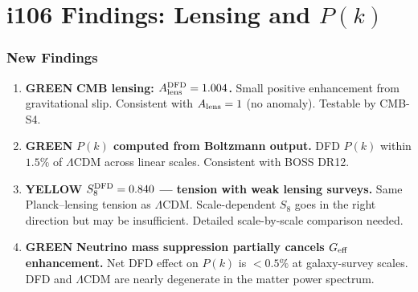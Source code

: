 \documentclass[11pt,a4paper]{article}
\theoremstyle{remark}
\newcommand{\GREEN}{\textcolor{dfdgreen}{\textbf{GREEN}}}
\newcommand{\YELLOW}{\textcolor{dfdred!70!black}{\textbf{YELLOW}}}
\begin{document}
\newpage
\part{i106 Findings: Lensing and $P(k)$}
\label{part:findings-lensing}

\section{New Findings}

\begin{enumerate}
\item[\textbf{F444}] \GREEN{} \textbf{CMB lensing: $A_{\rm lens}^{\rm DFD} = 1.004$.}
  Small positive enhancement from gravitational slip. Consistent with
  $A_{\rm lens} = 1$ (no anomaly). Testable by CMB-S4.

\item[\textbf{F445}] \GREEN{} \textbf{$P(k)$ computed from Boltzmann output.}
  DFD $P(k)$ within $1.5\%$ of $\Lambda$CDM across linear scales.
  Consistent with BOSS DR12.

\item[\textbf{F446}] \YELLOW{} \textbf{$S_8^{\rm DFD} = 0.840$ --- tension with weak lensing surveys.}
  Same Planck--lensing tension as $\Lambda$CDM. Scale-dependent $S_8$
  goes in the right direction but may be insufficient. Detailed
  scale-by-scale comparison needed.

\item[\textbf{F447}] \GREEN{} \textbf{Neutrino mass suppression partially cancels $G_{\rm eff}$ enhancement.}
  Net DFD effect on $P(k)$ is $< 0.5\%$ at galaxy-survey scales.
  DFD and $\Lambda$CDM are nearly degenerate in the matter power spectrum.
\end{enumerate}
\end{document}
